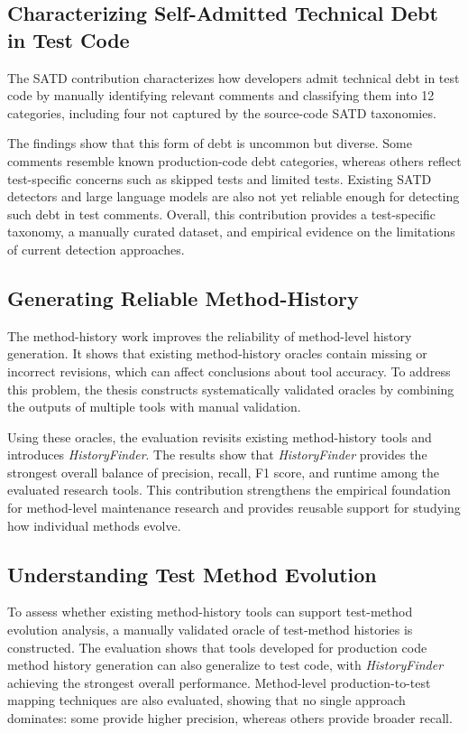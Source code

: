 \subsection{Characterizing Self-Admitted Technical Debt in Test Code}

The SATD contribution characterizes how developers admit technical debt in test code by manually identifying relevant comments and classifying them into 12 categories, including four not captured by the source-code SATD taxonomies.

The findings show that this form of debt is uncommon but diverse. Some comments resemble known production-code debt categories, whereas others reflect test-specific concerns such as skipped tests and limited tests. Existing SATD detectors and large language models are also not yet reliable enough for detecting such debt in test comments. Overall, this contribution provides a test-specific taxonomy, a manually curated dataset, and empirical evidence on the limitations of current detection approaches.

\subsection{Generating Reliable Method-History}

The method-history work improves the reliability of method-level history generation. It shows that existing method-history oracles contain missing or incorrect revisions, which can affect conclusions about tool accuracy. To address this problem, the thesis constructs systematically validated oracles by combining the outputs of multiple tools with manual validation.

Using these oracles, the evaluation revisits existing method-history tools and introduces \textit{HistoryFinder}. The results show that \textit{HistoryFinder} provides the strongest overall balance of precision, recall, F1 score, and runtime among the evaluated research tools. This contribution strengthens the empirical foundation for method-level maintenance research and provides reusable support for studying how individual methods evolve.

\subsection{Understanding Test Method Evolution}

To assess whether existing method-history tools can support test-method evolution analysis, a manually validated oracle of test-method histories is constructed. The evaluation shows that tools developed for production code method history generation can also generalize to test code, with \textit{HistoryFinder} achieving the strongest overall performance. Method-level production-to-test mapping techniques are also evaluated, showing that no single approach dominates: some provide higher precision, whereas others provide broader recall.

